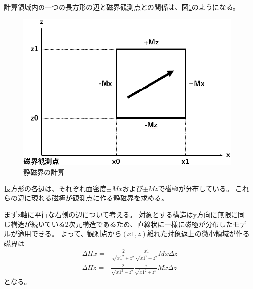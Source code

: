 \documentclass{jsarticle}
\begin{document}
計算領域内の一つの長方形の辺と磁界観測点との関係は、図\ref{fig03}のようになる。
\begin{figure}[H]
	\centering
	\includegraphics[width=14cm]{pic03.eps}
	\caption{静磁界の計算}
	\label{fig03}
\end{figure}
長方形の各辺は、それぞれ面密度$\pm Mx$および$\pm Mz$で磁極が分布している。
これらの辺に現れる磁極が観測点に作る静磁界を求める。

まずz軸に平行な右側の辺について考える。
対象とする構造はy方向に無限に同じ構造が続いている2次元構造であるため、直線状に一様に磁極が分布したモデルが適用できる。
よって、観測点から$(x1,z)$離れた対象返上の微小領域が作る磁界は
\begin{align}
	&\Delta Hx = -\frac{2}{\sqrt{x1^2 + z^2}} \frac{x1}{\sqrt{x1^2 + z^2}}Mx\Delta z	\label{01}	\\
	&\Delta Hz = -\frac{2}{\sqrt{x1^2 + z^2}}\frac{z}{\sqrt{x1^2 + z^2}}Mx\Delta z	\label{02}	
\end{align}
となる。
\end{document}
